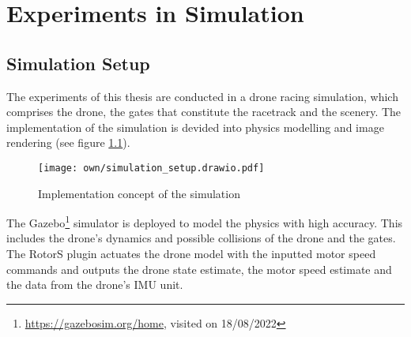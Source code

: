 \chapter{Experiments in Simulation}
\label{maintwo}

\section{Simulation Setup} \label{sec:sim_setup}
The experiments of this thesis 
are conducted in a drone racing simulation,
which comprises the drone, the gates that constitute the racetrack
and the scenery.
The implementation of the simulation
is devided into physics modelling and image rendering
(see figure \ref{fig:simulation_setup}).
\begin{figure}[h]
    \centering
    \texttt{[image: own/simulation\_setup.drawio.pdf]}
    \caption[
        Implementation concept of the simulation
    ]{
        Implementation concept of the simulation
    \label{fig:simulation_setup}
    }
\end{figure}

The Gazebo\footnote{
    \url{https://gazebosim.org/home}, visited on 18/08/2022
} 
simulator is deployed to model the physics with high accuracy.
This includes the drone's dynamics and
possible collisions of the drone and the gates.
The RotorS \cite{Furrer2016} plugin
actuates the drone model with the inputted motor speed commands
and outputs the drone state estimate, the motor speed estimate and the data 
from the drone's IMU unit.

